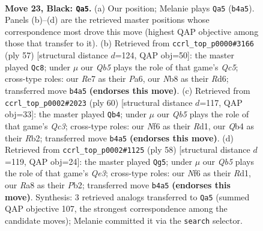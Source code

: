 \documentclass[11pt]{article}
\begin{document}
\clearpage

\begin{figure}[p]\centering
\begin{subfigure}{0.46\textwidth}\centering
\resizebox{\linewidth}{!}{%
\newchessgame
\chessboard[
  setfen={rnb3k1/4rp2/Pp3np1/1N1p2Np/Pq1P1P1P/R2B2P1/5K2/3Q3R b - - 6 23},
  showmover=false,
  pgfstyle=straightmove, color=movearrow, markmove={b4-a5}
]}
\caption{}
\end{subfigure}\hfill
\begin{subfigure}{0.46\textwidth}\centering
\resizebox{\linewidth}{!}{%
\newchessgame
\chessboard[
  setfen={4r3/5p1k/pp1r1bp1/3p3p/P1qNn3/2P1B2P/1P2QPP1/3RR1K1 b - - 7 29},
  showmover=false,
  pgfstyle=straightmove, color=movearrow, markmove={c4-c8}
]}
\caption{}
\end{subfigure}
\\[4pt]
\begin{subfigure}{0.46\textwidth}\centering
\resizebox{\linewidth}{!}{%
\newchessgame
\chessboard[
  setfen={4r1k1/1b1r1p2/1q4p1/1P1p3p/p1pN3P/PnQ1P1P1/1R3PB1/3R2K1 w - - 3 31},
  showmover=false,
  pgfstyle=straightmove, color=movearrow, markmove={c3-b4}
]}
\caption{}
\end{subfigure}\hfill
\begin{subfigure}{0.46\textwidth}\centering
\resizebox{\linewidth}{!}{%
\newchessgame
\chessboard[
  setfen={r3r1k1/2q2p2/p1Np1np1/P1nPp3/1RB3P1/4QP1p/1P5P/3R2K1 w - - 0 30},
  showmover=false,
  pgfstyle=straightmove, color=movearrow, markmove={e3-g5}
]}
\caption{}
\end{subfigure}
\caption{\textbf{Move 23, Black: \texttt{Qa5}.} (a) Our position; Melanie plays \texttt{Qa5} (\texttt{b4a5}). Panels (b)--(d) are the retrieved master positions whose correspondence most drove this move (highest QAP objective among those that transfer to it). (b) Retrieved from \texttt{ccrl\_top\_p0000\#3166} (ply 57) [structural distance $d$=124, QAP obj=50]: the master played \texttt{Qc8}; under $\mu$ our \emph{Qb5} plays the role of that game's \emph{Qc5}; cross-type roles: our \emph{R}e7 as their \emph{P}a6, our \emph{N}b8 as their \emph{R}d6; transferred move \texttt{b4a5} \textbf{(endorses this move)}. (c) Retrieved from \texttt{ccrl\_top\_p0002\#2023} (ply 60) [structural distance $d$=117, QAP obj=33]: the master played \texttt{Qb4}; under $\mu$ our \emph{Qb5} plays the role of that game's \emph{Qc3}; cross-type roles: our \emph{N}f6 as their \emph{R}d1, our \emph{Q}b4 as their \emph{R}b2; transferred move \texttt{b4a5} \textbf{(endorses this move)}. (d) Retrieved from \texttt{ccrl\_top\_p0002\#1125} (ply 58) [structural distance $d$=119, QAP obj=24]: the master played \texttt{Qg5}; under $\mu$ our \emph{Qb5} plays the role of that game's \emph{Qe3}; cross-type roles: our \emph{N}f6 as their \emph{R}d1, our \emph{R}a8 as their \emph{P}b2; transferred move \texttt{b4a5} \textbf{(endorses this move)}. Synthesis: 3 retrieved analogs transferred to \texttt{Qa5} (summed QAP objective 107, the strongest correspondence among the candidate moves); Melanie committed it via the \texttt{search} selector.}
\label{fig:thought-m45}
\end{figure}
\end{document}

